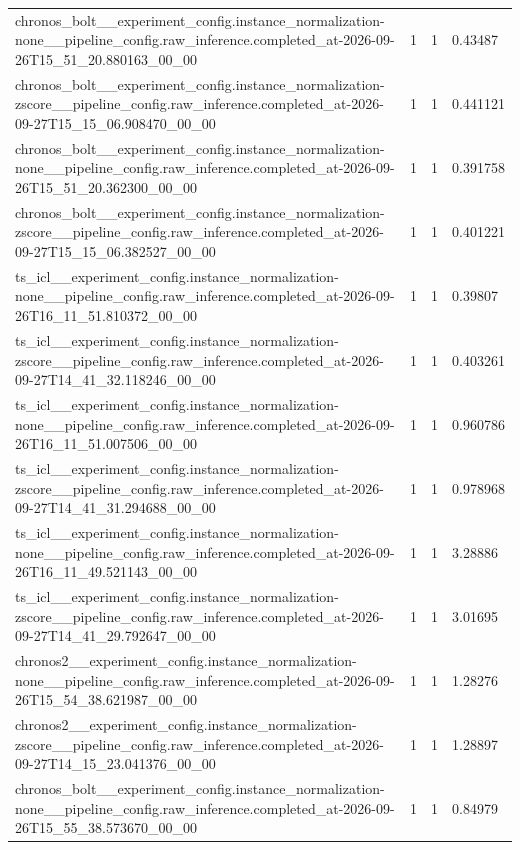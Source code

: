 \begin{tabular}{llll}
chronos\_bolt\_\_experiment\_config.instance\_normalization-none\_\_pipeline\_config.raw\_inference.completed\_at-2026-09-26T15\_51\_20.880163\_00\_00 & 1 & 1 & 0.43487 \\
chronos\_bolt\_\_experiment\_config.instance\_normalization-zscore\_\_pipeline\_config.raw\_inference.completed\_at-2026-09-27T15\_15\_06.908470\_00\_00 & 1 & 1 & 0.441121 \\
chronos\_bolt\_\_experiment\_config.instance\_normalization-none\_\_pipeline\_config.raw\_inference.completed\_at-2026-09-26T15\_51\_20.362300\_00\_00 & 1 & 1 & 0.391758 \\
chronos\_bolt\_\_experiment\_config.instance\_normalization-zscore\_\_pipeline\_config.raw\_inference.completed\_at-2026-09-27T15\_15\_06.382527\_00\_00 & 1 & 1 & 0.401221 \\
ts\_icl\_\_experiment\_config.instance\_normalization-none\_\_pipeline\_config.raw\_inference.completed\_at-2026-09-26T16\_11\_51.810372\_00\_00 & 1 & 1 & 0.39807 \\
ts\_icl\_\_experiment\_config.instance\_normalization-zscore\_\_pipeline\_config.raw\_inference.completed\_at-2026-09-27T14\_41\_32.118246\_00\_00 & 1 & 1 & 0.403261 \\
ts\_icl\_\_experiment\_config.instance\_normalization-none\_\_pipeline\_config.raw\_inference.completed\_at-2026-09-26T16\_11\_51.007506\_00\_00 & 1 & 1 & 0.960786 \\
ts\_icl\_\_experiment\_config.instance\_normalization-zscore\_\_pipeline\_config.raw\_inference.completed\_at-2026-09-27T14\_41\_31.294688\_00\_00 & 1 & 1 & 0.978968 \\
ts\_icl\_\_experiment\_config.instance\_normalization-none\_\_pipeline\_config.raw\_inference.completed\_at-2026-09-26T16\_11\_49.521143\_00\_00 & 1 & 1 & 3.28886 \\
ts\_icl\_\_experiment\_config.instance\_normalization-zscore\_\_pipeline\_config.raw\_inference.completed\_at-2026-09-27T14\_41\_29.792647\_00\_00 & 1 & 1 & 3.01695 \\
chronos2\_\_experiment\_config.instance\_normalization-none\_\_pipeline\_config.raw\_inference.completed\_at-2026-09-26T15\_54\_38.621987\_00\_00 & 1 & 1 & 1.28276 \\
chronos2\_\_experiment\_config.instance\_normalization-zscore\_\_pipeline\_config.raw\_inference.completed\_at-2026-09-27T14\_15\_23.041376\_00\_00 & 1 & 1 & 1.28897 \\
chronos\_bolt\_\_experiment\_config.instance\_normalization-none\_\_pipeline\_config.raw\_inference.completed\_at-2026-09-26T15\_55\_38.573670\_00\_00 & 1 & 1 & 0.84979 \\

\end{tabular}
